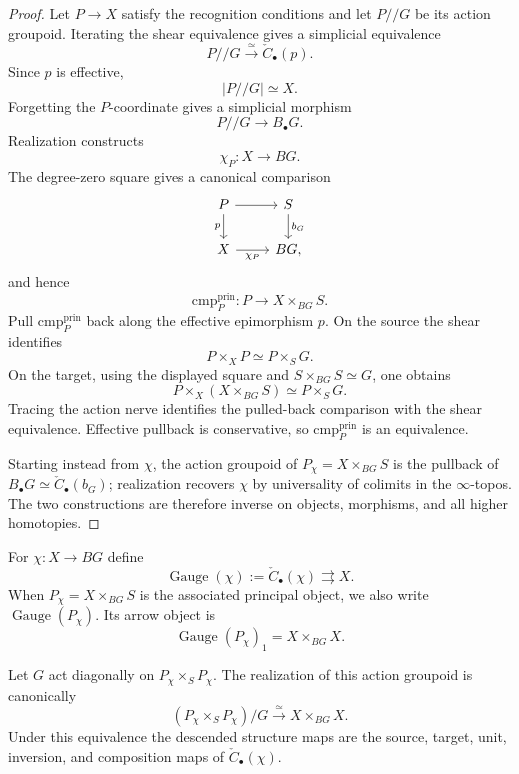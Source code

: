 \begin{proof}
Let $P\to X$ satisfy the recognition conditions and let $P/\!/G$ be its action
groupoid.  Iterating the shear equivalence gives a simplicial equivalence
\[
    P/\!/G\xrightarrow{\simeq}\check C_\bullet(p).
\]
Since $p$ is effective,
\[
    |P/\!/G|\simeq X.
\]
Forgetting the $P$-coordinate gives a simplicial morphism
\[
    P/\!/G\longrightarrow B_\bullet G.
\]
Realization constructs
\[
    \chi_P:X\longrightarrow BG.
\]
The degree-zero square gives a canonical comparison
\[
\begin{tikzcd}
P \arrow[r] \arrow[d,"p"'] & S \arrow[d,"b_G"]\\
X \arrow[r,"\chi_P"'] & BG,
\end{tikzcd}
\]
and hence
\[
    \mathrm{cmp}^{\mathrm{prin}}_P:P\longrightarrow X\times_{BG}S.
\]
Pull $\mathrm{cmp}^{\mathrm{prin}}_P$ back along the effective epimorphism $p$.  On the source the shear
identifies
\[
    P\times_XP\simeq P\times_SG.
\]
On the target, using the displayed square and
$S\times_{BG}S\simeq G$, one obtains
\[
    P\times_X(X\times_{BG}S)
    \simeq
    P\times_SG.
\]
Tracing the action nerve identifies the pulled-back comparison with the shear
equivalence.  Effective pullback is conservative, so $\mathrm{cmp}^{\mathrm{prin}}_P$ is an equivalence.

Starting instead from $\chi$, the action groupoid of
$P_\chi=X\times_{BG}S$ is the pullback of
$B_\bullet G\simeq\check C_\bullet(b_G)$; realization recovers $\chi$ by
universality of colimits in the $\infty$-topos.  The two constructions are
therefore inverse on objects, morphisms, and all higher homotopies.
\end{proof}

\begin{definition}
\label{def:gauge-groupoid}
For $\chi:X\to BG$ define
\[
    \operatorname{Gauge}(\chi)
    :=
    \check C_\bullet(\chi)
    \rightrightarrows X.
\]
When $P_\chi=X\times_{BG}S$ is the associated principal object, we also write
$\operatorname{Gauge}(P_\chi)$.  Its arrow object is
\[
    \operatorname{Gauge}(P_\chi)_1=X\times_{BG}X.
\]
\end{definition}

\begin{proposition}
\label{prop:gauge-arrow-quotient}
Let $G$ act diagonally on $P_\chi\times_SP_\chi$.  The realization of this
action groupoid is canonically
\[
    (P_\chi\times_SP_\chi)/G
    \xrightarrow{\simeq}
    X\times_{BG}X.
\]
Under this equivalence the descended structure maps are the source, target,
unit, inversion, and composition maps of $\check C_\bullet(\chi)$.
\end{proposition}

